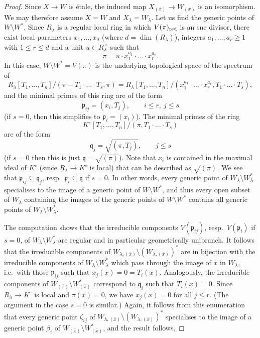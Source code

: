 \begin{proof}
Since $X\to W$ is \'etale, the induced map $X_{(\bar x)}\to W_{(\bar x)}$ is an isomorphism. We may therefore assume $X=W$ and $X_\lambda=W_\lambda$. Let us find the generic points of $W\setminus W^*$. Since $R_\lambda$ is a regular local ring in which $V(\pi)_{\rm red}$ is an snc divisor, there exist local parameters $x_1,\dots, x_d$ (where $d=\dim(R_\lambda)$), integers $a_1,\dots,a_r\geq 1$ with $1 \leq r\leq d$ and a unit $u \in R_{\lambda}^\times$ such that
\[
    \pi=u \cdot x_1^{a_1}\cdot\ldots\cdot x^{a_r}_r. 
\]
In this case, $W\setminus W^*=V(\pi)$ is the underlying topological space of the spectrum of 
\[
    R_\lambda[T_1,\dots, T_n]/(\pi - T_1\cdot\ldots\cdot T_s,\pi) = R_\lambda[T_1,\dots, T_n]/(x_1^{a_1}\cdot\ldots\cdot x^{a_r}_r, T_1\cdot\ldots\cdot T_s),
\]
and the minimal primes of this ring 
are of the form 
\[
\mathfrak{p}_{ij} = (x_i, T_j), \qquad i \leq r, \ j \leq s
\]
(if $s=0$, then this simplifies to $\mathfrak{p}_i=(x_i)$). The minimal primes of the ring 
\[
K^\circ[T_1,\dots, T_n]/(\pi, T_1\cdot\ldots\cdot T_s)
\]
are of the form 
\[
\mathfrak{q}_j = \sqrt{(\pi, T_j)},  \qquad j \leq s
\]
(if $s=0$ then this is just $\mathfrak{q} = \sqrt{(\pi)}$). Note that $x_i$ is contained in the maximal ideal of $K^\circ$ (since $R_\lambda \to K^\circ$ is local) that can be described as $\sqrt{(\pi)}$. We see that $\mathfrak{p}_{ij}\subseteq \mathfrak{q}_j$, resp.~$\mathfrak{p}_i \subseteq \mathfrak{q}$ if $s=0$. In other words, every generic point of $W_\lambda\setminus W^*_\lambda$ specialises to the image of a generic point of $W\setminus W^*$, and thus every open subset of $W_\lambda$ containing the images of the generic points of $W\setminus W^*$ contains all generic points of $W_\lambda\setminus W^*_\lambda$.

The computation shows that the irreducible components $V(\mathfrak{p}_{ij})$, resp.~$V(\mathfrak{p}_i)$ if $s=0$, of $W_\lambda\setminus W^*_\lambda$ are regular and in particular geometrically unibranch. It follows that the irreducible components of $W_{\lambda,(\bar x)} \setminus (W_{\lambda,(\bar x)})^*$ are in bijection with the irreducible components of $W_\lambda\setminus W^*_\lambda$ which pass through the image of $\bar x$ in $W_\lambda$, i.e.\ with those $\mathfrak{p}_{ij}$ such that $x_j(\bar x)=0=T_i(\bar x)$. Analogously, the irreducible components of $W_{(\bar x)}\setminus W^*_{(\bar x)}$ correspond to $\mathfrak{q}_i$ such that $T_i(\bar x) = 0$. Since $R_\lambda\to K^\circ$ is local and $\pi(\bar x)=0$, we have $x_j(\bar x)=0$ for all $j\leq r$. (The argument in the case $s=0$ is similar.) Again, it follows from this enumeration that every generic point $\zeta_{ij}$ of $W_{\lambda,(\bar x)} \setminus (W_{\lambda,(\bar x)})^*$ 
specialises to the image of a generic point $\beta_i$ of $W_{(\bar x)}\setminus W^*_{(\bar x)}$, and the result follows.
\end{proof}

